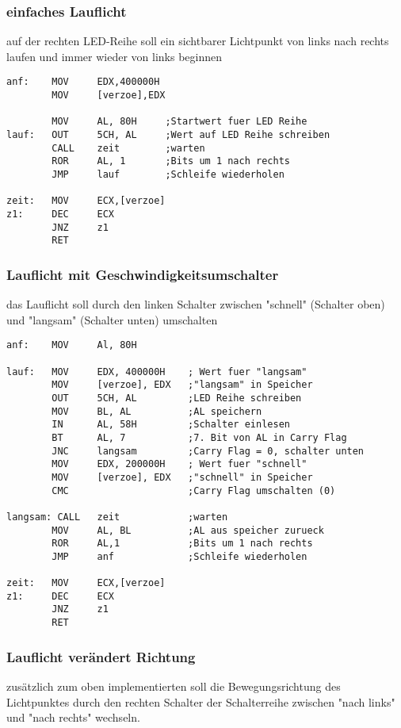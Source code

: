 \documentclass[a4paper,12pt,titlepage]{scrartcl}
\begin{document}
\subsubsection*{einfaches Lauflicht}
auf der rechten LED-Reihe soll ein sichtbarer Lichtpunkt von links nach rechts laufen und immer wieder von links beginnen

\begin{lstlisting}
anf:    MOV     EDX,400000H
        MOV     [verzoe],EDX

        MOV     AL, 80H     ;Startwert fuer LED Reihe
lauf:   OUT     5CH, AL     ;Wert auf LED Reihe schreiben
        CALL    zeit        ;warten
        ROR     AL, 1       ;Bits um 1 nach rechts 
        JMP     lauf        ;Schleife wiederholen

zeit:   MOV     ECX,[verzoe]
z1:     DEC     ECX
        JNZ     z1
        RET
\end{lstlisting}

\subsubsection*{Lauflicht mit Geschwindigkeitsumschalter}
das Lauflicht soll durch den linken Schalter zwischen "schnell" (Schalter oben) und "langsam" (Schalter unten) umschalten

\begin{lstlisting}
anf:    MOV     Al, 80H

lauf:   MOV     EDX, 400000H    ; Wert fuer "langsam"
        MOV     [verzoe], EDX   ;"langsam" in Speicher
        OUT     5CH, AL         ;LED Reihe schreiben
        MOV     BL, AL          ;AL speichern
        IN      AL, 58H         ;Schalter einlesen
        BT      AL, 7           ;7. Bit von AL in Carry Flag
        JNC     langsam         ;Carry Flag = 0, schalter unten
        MOV     EDX, 200000H    ; Wert fuer "schnell"
        MOV     [verzoe], EDX   ;"schnell" in Speicher
        CMC                     ;Carry Flag umschalten (0)

langsam: CALL   zeit            ;warten
        MOV     AL, BL          ;AL aus speicher zurueck
        ROR     AL,1            ;Bits um 1 nach rechts
        JMP     anf             ;Schleife wiederholen

zeit:   MOV     ECX,[verzoe]
z1:     DEC     ECX
        JNZ     z1
        RET
\end{lstlisting}

\subsubsection*{Lauflicht verändert Richtung}
zusätzlich zum oben implementierten soll die Bewegungsrichtung des Lichtpunktes durch den rechten Schalter der Schalterreihe zwischen "nach links" und "nach rechts" wechseln.
\end{document}
